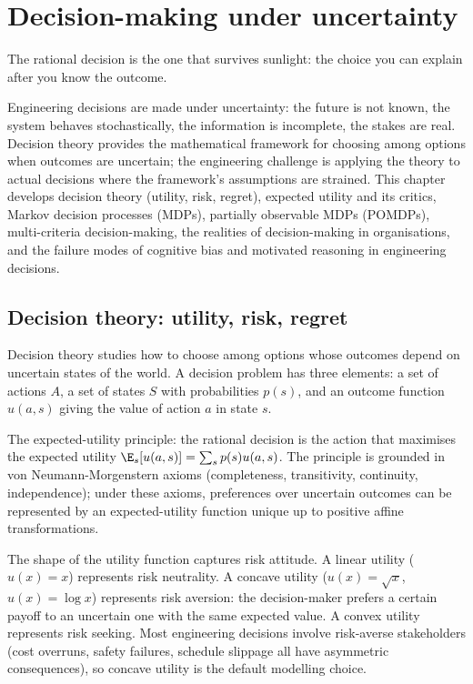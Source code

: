\chapter{Decision-making under uncertainty}
\label{vol09:ch11}

\epigraph{The rational decision is the one that survives sunlight: the choice you can explain after you know the outcome.}{}


\noindent
Engineering decisions are made under uncertainty: the future is not known, the system behaves stochastically, the information is incomplete, the stakes are real. Decision theory provides the mathematical framework for choosing among options when outcomes are uncertain; the engineering challenge is applying the theory to actual decisions where the framework's assumptions are strained. This chapter develops decision theory (utility, risk, regret), expected utility and its critics, Markov decision processes (MDPs), partially observable MDPs (POMDPs), multi-criteria decision-making, the realities of decision-making in organisations, and the failure modes of cognitive bias and motivated reasoning in engineering decisions.

\section{Decision theory: utility, risk, regret}

Decision theory studies how to choose among options whose outcomes depend on uncertain states of the world. A decision problem has three elements: a set of actions $A$, a set of states $S$ with probabilities $p(s)$, and an outcome function $u(a, s)$ giving the value of action $a$ in state $s$.

The expected-utility principle: the rational decision is the action that maximises the expected utility $\E_s[u(a, s)] = \sum_s p(s) u(a, s)$. The principle is grounded in von Neumann-Morgenstern axioms (completeness, transitivity, continuity, independence); under these axioms, preferences over uncertain outcomes can be represented by an expected-utility function unique up to positive affine transformations.

The shape of the utility function captures risk attitude. A linear utility ($u(x) = x$) represents risk neutrality. A concave utility ($u(x) = \sqrt{x}$, $u(x) = \log x$) represents risk aversion: the decision-maker prefers a certain payoff to an uncertain one with the same expected value. A convex utility represents risk seeking. Most engineering decisions involve risk-averse stakeholders (cost overruns, safety failures, schedule slippage all have asymmetric consequences), so concave utility is the default modelling choice.


